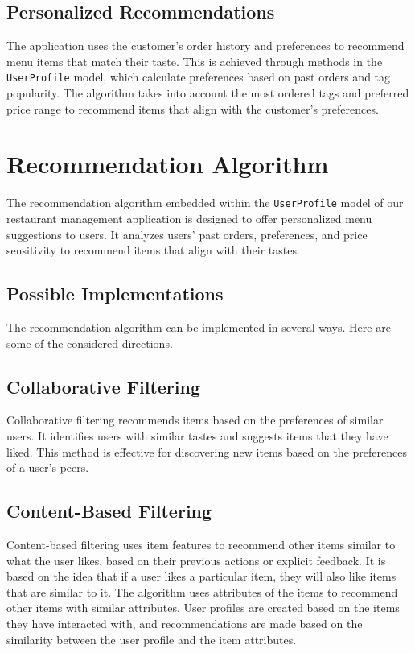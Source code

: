 \subsection{Personalized Recommendations}
The application uses the customer's order history and preferences to recommend menu items that match their taste. This is achieved through methods in the \texttt{UserProfile} model, which calculate preferences based on past orders and tag popularity. The algorithm takes into account the most ordered tags and preferred price range to recommend items that align with the customer's preferences.

\section{Recommendation Algorithm}
The recommendation algorithm embedded within the \texttt{UserProfile} model of our restaurant management application is designed to offer personalized menu suggestions to users. It analyzes users' past orders, preferences, and price sensitivity to recommend items that align with their tastes.

\subsection{Possible Implementations}
The recommendation algorithm can be implemented in several ways. Here are some of the considered directions.

\subsection*{Collaborative Filtering}
Collaborative filtering recommends items based on the preferences of similar users. It identifies users with similar tastes and suggests items that they have liked. This method is effective for discovering new items based on the preferences of a user's peers.

\subsection*{Content-Based Filtering}
Content-based filtering uses item features to recommend other items similar to what the user likes, based on their previous actions or explicit feedback. It is based on the idea that if a user likes a particular item, they will also like items that are similar to it. The algorithm uses attributes of the items to recommend other items with similar attributes. User profiles are created based on the items they have interacted with, and recommendations are made based on the similarity between the user profile and the item attributes.

